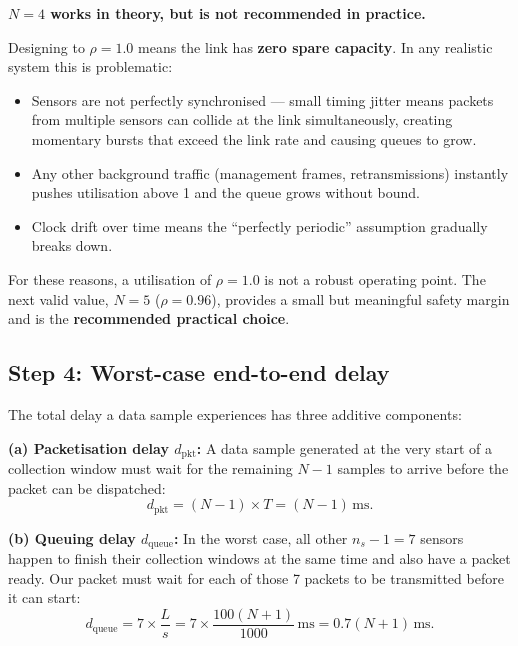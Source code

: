 \documentclass[12pt, a4paper]{article}
\begin{document}
\begin{warnbox}
  \textbf{$N = 4$ works in theory, but is not recommended in practice.}

  Designing to $\rho = 1.0$ means the link has \textbf{zero spare capacity}.
  In any realistic system this is problematic:
  \begin{itemize}[leftmargin=1.2em, itemsep=2pt]
    \item Sensors are not perfectly synchronised --- small timing jitter means
      packets from multiple sensors can collide at the link simultaneously,
      creating momentary bursts that exceed the link rate and causing queues
      to grow.
    \item Any other background traffic (management frames, retransmissions)
      instantly pushes utilisation above 1 and the queue grows without bound.
    \item Clock drift over time means the ``perfectly periodic'' assumption
      gradually breaks down.
  \end{itemize}
  For these reasons, a utilisation of $\rho = 1.0$ is not a robust operating
  point. The next valid value, $N = 5$ ($\rho = 0.96$), provides a small but
  meaningful safety margin and is the \textbf{recommended practical choice}.
\end{warnbox}

\clearpage
\subsection*{Step 4: Worst-case end-to-end delay}

The total delay a data sample experiences has three additive components:

\textbf{(a) Packetisation delay $d_\text{pkt}$:}
A data sample generated at the very start of a collection window must wait
for the remaining $N-1$ samples to arrive before the packet can be dispatched:
\[
  d_\text{pkt} = (N-1) \times T = (N-1)\,\mathrm{ms}.
\]

\textbf{(b) Queuing delay $d_\text{queue}$:}
In the worst case, all other $n_s - 1 = 7$ sensors happen to finish their
collection windows at the same time and also have a packet ready. Our packet
must wait for each of those 7 packets to be transmitted before it can start:
\[
  d_\text{queue} = 7 \times \frac{L}{s}
  = 7 \times \frac{100(N+1)}{1000}\,\mathrm{ms}
  = 0.7(N+1)\,\mathrm{ms}.
\]
\end{document}
